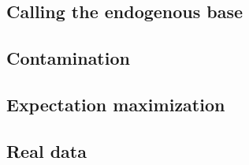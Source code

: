 \documentclass[a4paper,12pt]{article}
\begin{document}


\subsection{Calling the endogenous base}

\subsection{Contamination}

\subsection{Expectation maximization}


\subsection{Real data}



{}

\end{document}
